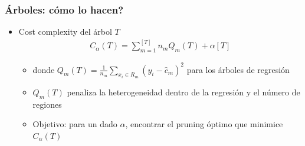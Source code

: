 \documentclass[
  shownotes,
  xcolor={svgnames},
  hyperref={colorlinks,citecolor=DarkBlue,linkcolor=DarkRed,urlcolor=DarkBlue}
  , aspectratio=169]{beamer}
\begin{document}
\begin{frame}[fragile]
\frametitle{Árboles: cómo lo hacen?}

\begin{itemize}
\item Cost complexity del árbol  $T$
\begin{align}
  C_{\alpha}(T)= \sum_{m=1}^{[T]} n_m Q_m (T) + \alpha [T]
\end{align}

  \begin{itemize}
  \item donde $Q_m (T)=\frac{1}{n_m} \sum_{x_i\in R_m} (y_i-\hat{c}_m)^2$ para los árboles de regresión
  \medskip
  \item  $Q_m (T)$ penaliza la heterogeneidad dentro de la regresión y el número de regiones 
  \medskip
  \item  Objetivo: para un dado $\alpha$, encontrar el pruning óptimo que minimice  $C_{\alpha}(T)$
  \end{itemize}
\end{itemize}
\end{frame}
\end{document}
